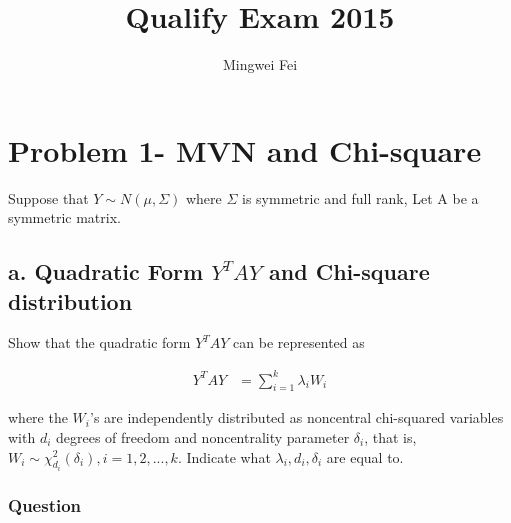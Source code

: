 \documentclass[11pt]{article} %
\title{Qualify Exam 2015}
\author{Mingwei Fei}
\begin{document}
	
	\maketitle
	
\section{Problem 1- MVN and Chi-square}
	Suppose that $Y \sim N(\mu, \Sigma)$ where $\Sigma$ is symmetric and full rank,  Let A be a symmetric matrix.
	
\subsection{a. Quadratic Form $Y^T A Y$ and Chi-square distribution}
	Show that the quadratic form $Y^T A Y$ can be represented as

	\begin{align*}
		Y^T A Y &= \sum_{i=1}^k \lambda_i W_i
	\end{align*}	

	where the $W_i$’s are independently distributed as noncentral chi-squared variables	with $d_i$ degrees of freedom and noncentrality parameter $\delta_i$, that is, $W_i \sim \chi^2_	{d_i}(\delta_i), i =1, 2, ..., k$. Indicate what $\lambda_i, d_i, \delta_i$ are equal to.
	
\subsubsection{Question}
\end{document}
